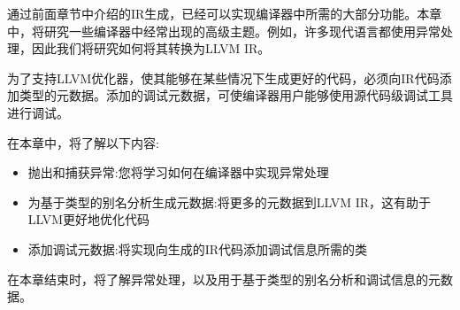 
通过前面章节中介绍的IR生成，已经可以实现编译器中所需的大部分功能。本章中，将研究一些编译器中经常出现的高级主题。例如，许多现代语言都使用异常处理，因此我们将研究如何将其转换为LLVM IR。

为了支持LLVM优化器，使其能够在某些情况下生成更好的代码，必须向IR代码添加类型的元数据。添加的调试元数据，可使编译器用户能够使用源代码级调试工具进行调试。

在本章中，将了解以下内容:

\begin{itemize}
\item
抛出和捕获异常:您将学习如何在编译器中实现异常处理

\item
为基于类型的别名分析生成元数据:将更多的元数据到LLVM IR，这有助于LLVM更好地优化代码

\item
添加调试元数据:将实现向生成的IR代码添加调试信息所需的类
\end{itemize}

在本章结束时，将了解异常处理，以及用于基于类型的别名分析和调试信息的元数据。





















